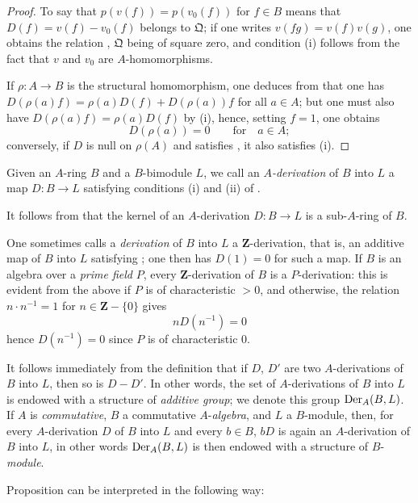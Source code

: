 \begin{proof}
To say that $p(v(f))=p(v_0(f))$ for $f\in B$ means that $D(f)=v(f)-v_0(f)$ belongs to $\mathfrak{Q}$; if one writes $v(fg)=v(f)v(g)$, one obtains the relation , $\mathfrak{Q}$ being of square zero, and condition (i) follows from the fact that $v$ and $v_0$ are $A$-homomorphisms.

If $\rho:A\to B$ is the structural homomorphism, one deduces from  that one has $D(\rho(a)f)=\rho(a)D(f)+D(\rho(a))f$ for all $a\in A$; but one must also have $D(\rho(a)f)=\rho(a)D(f)$ by (i), hence, setting $f=1$, one obtains
\[
  D(\rho(a)) = 0 \qquad\text{for}\quad a\in A;
\]
conversely, if $D$ is null on $\rho(A)$ and satisfies , it also satisfies (i).
\end{proof}

\begin{definition}[20.1.2]
\label{0.20.1.2}
Given an $A$-ring $B$ and a $B$-bimodule $L$, we call an \emph{$A$-derivation} of $B$ into $L$ a map $D:B\to L$ satisfying conditions (i) and (ii) of .
\end{definition}

It follows from  that the kernel of an $A$-derivation $D:B\to L$ is a sub-$A$-ring of $B$.

One sometimes calls a \emph{derivation} of $B$ into $L$ a $\mathbf{Z}$-derivation, that is, an additive map of $B$ into $L$ satisfying ; one then has $D(1)=0$ for such a map.
If $B$ is an algebra over a \emph{prime field} $P$, every $\mathbf{Z}$-derivation of $B$ is a $P$-derivation: this is evident from the above if $P$ is of characteristic $>0$, and otherwise, the relation $n\cdot n^{-1}=1$ for $n\in\mathbf{Z}-\{0\}$ gives
\[
  nD(n^{-1}) = 0
\]
hence $D(n^{-1})=0$ since $P$ is of characteristic $0$.

It follows immediately from the definition  that if $D$, $D'$ are two $A$-derivations of $B$ into $L$, then so is $D-D'$.
In other words, the set of $A$-derivations of $B$ into $L$ is endowed with a structure of \emph{additive group}; we denote this group $\operatorname{Der}_A(B,L)$.
If $A$ is \emph{commutative}, $B$ a commutative $A$-\emph{algebra}, and $L$ a $B$-module, then, for every $A$-derivation $D$ of $B$ into $L$ and every $b\in B$, $bD$ is again an $A$-derivation of $B$ into $L$, in other words $\operatorname{Der}_A(B,L)$ is then endowed with a structure of $B$-\emph{module}.

Proposition  can be interpreted in the following way:

